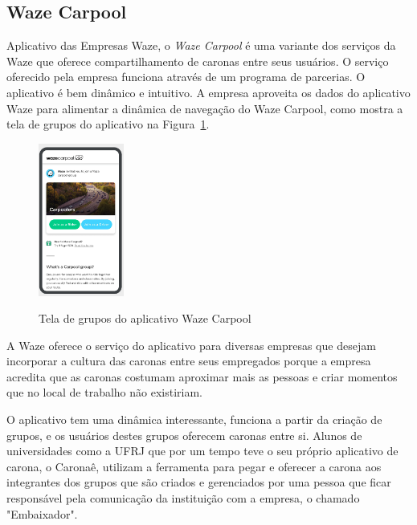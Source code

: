 
\subsection{Waze Carpool}
Aplicativo das Empresas Waze, o \textit{Waze Carpool} é uma variante dos serviços da Waze que oferece compartilhamento de caronas entre seus usuários. O serviço oferecido pela empresa funciona através de um programa de parcerias. O aplicativo é bem dinâmico e intuitivo. A empresa aproveita os dados do aplicativo Waze para alimentar a dinâmica de navegação do Waze Carpool, como mostra a tela de grupos do aplicativo na Figura~\ref{fig:tela_grupos_wazecarpool}.

\begin{figure}[!hbtp]
	\centering
	\caption{Tela de grupos do aplicativo Waze Carpool}
	\includegraphics[width=0.25\textwidth]{./04-figuras/waze/Tela_de_grupos.png}
	\label{fig:tela_grupos_wazecarpool}
\end{figure}

A Waze oferece o serviço do aplicativo para diversas empresas que desejam incorporar a cultura das caronas entre seus empregados porque a empresa acredita que as caronas costumam aproximar mais as pessoas e criar momentos que no local de trabalho não existiriam.

O aplicativo tem uma dinâmica interessante, funciona a partir da criação de grupos, e os usuários destes grupos oferecem caronas entre si. Alunos de universidades como a UFRJ que por um tempo teve o seu próprio aplicativo de carona, o Caronaê, utilizam a ferramenta para pegar e oferecer a carona aos integrantes dos grupos que são criados e gerenciados por uma pessoa que ficar responsável pela comunicação da instituição com a empresa, o chamado "Embaixador".




